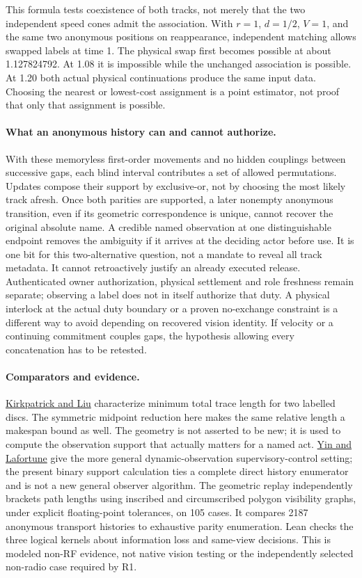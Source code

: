 \documentclass{article}
\begin{document}
This formula tests coexistence of both tracks, not merely that the
two independent speed cones admit the association. With $r=1$,
$d=1/2$, $V=1$, and the same two anonymous positions on reappearance,
independent matching allows swapped labels at time 1. The physical swap
first becomes possible at about 1.127824792. At 1.08 it is impossible
while the unchanged association is possible. At 1.20 both actual
physical continuations produce the same input data. Choosing the
nearest or lowest-cost assignment is a point estimator, not proof
that only that assignment is possible.

\paragraph{What an anonymous history can and cannot authorize.}
With these memoryless first-order movements and no hidden couplings
between successive gaps, each blind interval contributes a set of
allowed permutations. Updates compose their support by exclusive-or,
not by choosing the most likely track afresh. Once both parities are
supported, a later nonempty anonymous transition, even if its
geometric correspondence is unique, cannot recover the original
absolute name. A credible named observation at one distinguishable
endpoint removes the ambiguity if it arrives at the deciding actor
before use. It is one bit for this two-alternative question, not a
mandate to reveal all track metadata. It cannot retroactively justify
an already executed release. Authenticated owner authorization,
physical settlement and role freshness remain separate; observing a
label does not in itself authorize that duty. A physical interlock at
the actual duty boundary or a proven no-exchange constraint is a
different way to avoid depending on recovered vision identity.
If velocity or a continuing commitment couples gaps, the hypothesis
allowing every concatenation has to be retested.

\paragraph{Comparators and evidence.}
\href{https://arxiv.org/abs/1607.04005}{Kirkpatrick and Liu} characterize
minimum total trace length for two labelled discs. The symmetric
midpoint reduction here makes the same relative length a makespan bound
as well. The geometry is not asserted to be new; it is used to compute
the observation support that actually matters for a named act.
\href{https://www.sciencedirect.com/science/article/pii/S0005109815003490}{Yin and Lafortune}
give the more general dynamic-observation supervisory-control setting;
the present binary support calculation ties a complete direct history
enumerator and is not a new general observer algorithm.
The geometric replay independently brackets path lengths using
inscribed and circumscribed polygon visibility graphs, under explicit
floating-point tolerances, on 105 cases. It compares 2187 anonymous
transport histories to exhaustive parity enumeration. Lean checks the
three logical kernels about information loss and same-view decisions.
This is modeled non-RF evidence, not native vision testing or the
independently selected non-radio case required by R1.
\end{document}
